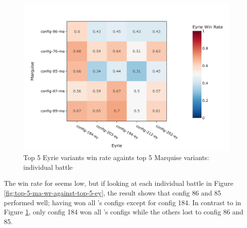 \begin{figure}[h!]
    \begin{center}
        \includegraphics[width=\textwidth]{./images/fig-stage-2-eyrie-win-rate.jpeg}
    \end{center}
    \caption{Top 5 Eyrie variants win rate againts top 5 Marquise variants: individual battle}
    \label{fig:top-5-ey-wr-against-top-5-ma}
\end{figure}

The win rate for \Marquise{} seems low, but if looking at each individual battle in Figure \ref{fig:top-5-ma-wr-against-top-5-ey}, the result shows that config 86 and 85 performed well; having won all \Eyrie{}'s configs except for config 184. In contrast to \Eyrie{} in Figure \ref{fig:top-5-ey-wr-against-top-5-ma}, only config 184 won all \Marquise{}'s configs while the others lost to config 86 and 85.

